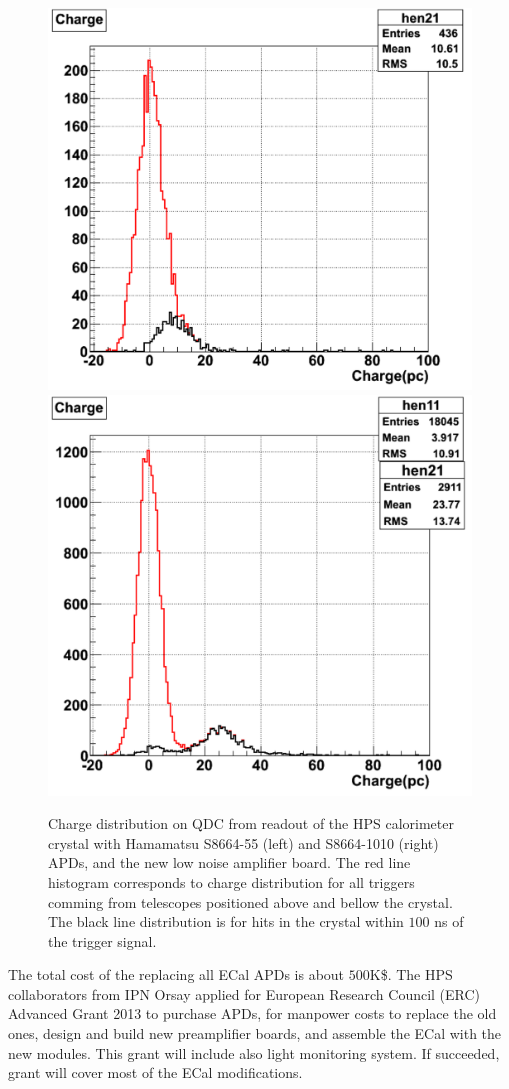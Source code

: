 \begin{figure}[t]
\includegraphics[scale=0.37]{ecal/MIP_5x5_APD.png}
\includegraphics[scale=0.37]{ecal/MIP_10x10_APD.png}
\caption{\small{Charge distribution on QDC from readout of the HPS calorimeter crystal with Hamamatsu S8664-55 (left) and S8664-1010 (right) APDs, and the new low noise amplifier board. The red line histogram corresponds to charge distribution for all triggers comming from telescopes positioned above and bellow the crystal. The black line distribution is for hits in the crystal within $100$ ns of the trigger signal. }}\label{fig:mip10x10}
\end{figure}

The total cost of the replacing all ECal APDs is about $500$K\$. The HPS collaborators from IPN Orsay applied for  European Research Council (ERC) Advanced Grant 2013 to purchase APDs, for manpower costs to replace the old ones, design and build new preamplifier boards, and assemble the ECal with the new modules. This grant will include also light monitoring system. If succeeded, grant will cover most of the ECal modifications. 

